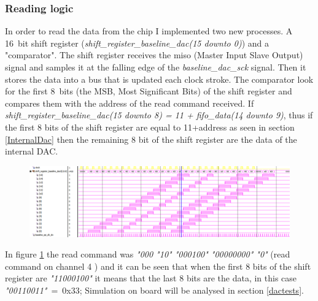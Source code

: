 \subsubsection{Reading logic}
In order to read the data from the chip I implemented two new processes. A 16~bit shift register (\textit{shift\_register\_baseline\_dac(15 downto 0)}) and a "comparator".
The shift register receives the miso (Master Input Slave Output) signal and samples it at the falling edge of the \textit{baseline\_dac\_sck} signal. Then it stores the data into a bus that is updated each clock stroke.
The comparator look for the first 8~bits (the MSB, Most Significant Bits) of the shift register and compares them with the address of the read command received.
If \textit{shift\_register\_baseline\_dac(15 downto 8) = 11 + fifo\_data(14 downto 9)}, thus if the first 8 bits of the shift register are equal to 11+address as seen in section \ref{InternalDac} then the remaining 8 bit of the shift register are the data of the internal DAC.
\begin{figure}[H]
	\centering
	\includegraphics[width=1.0\linewidth]{IMG/ch4/DACsimulations/FSMshiftregister}
	\caption{}
	\label{fig:fsmshiftregister}
\end{figure}
\noindent In figure \ref{fig:fsmshiftregister} the read command was \textit{"000 "10" "000100" "00000000" "0"} (read command on channel 4 ) and it can be seen that when the first 8 bits of the shift register are \textit{"11000100"} it means that the last 8 bits are the data, in this case \textit{"00110011"}~=~0x33;
\newline
Simulation on board will be analysed  in section \ref{dactests}.

